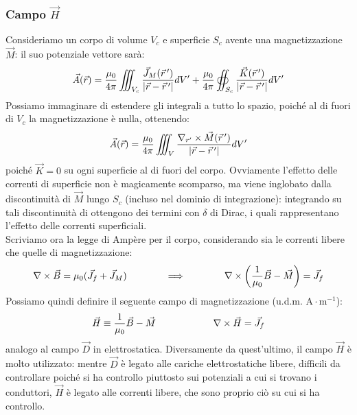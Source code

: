 \documentclass[]{article}
\begin{document}
\subsubsection{Campo $ \vec{H} $}

Consideriamo un corpo di volume $ V_c $ e superficie $ S_c $ avente una magnetizzazione $ \vec{M} $: il suo potenziale vettore sarà:
\begin{equation}
	\vec{A}(\vec{r}) = \frac{\mu_0}{4\pi} \iiint_{V_c} \frac{\vec{J}_M(\vec{r}\,')}{\left\lvert\vec{r}-\vec{r}\,'\right\rvert} dV' + \frac{\mu_0}{4\pi} \oiint_{S_c} \frac{\vec{K}(\vec{r}\,')}{\left\lvert\vec{r}-\vec{r}\,'\right\rvert} dV'
	\label{eq:20}
\end{equation}
Possiamo immaginare di estendere gli integrali a tutto lo spazio, poiché al di fuori di $ V_c $ la magnetizzazione è nulla, ottenendo:
\begin{equation}
	\vec{A}(\vec{r}) = \frac{\mu_0}{4\pi} \iiint_V \frac{\nabla_{r'}\times\vec{M}(\vec{r}\,')}{\left\lvert\vec{r}-\vec{r}\,'\right\rvert}dV'
	\label{eq:21}
\end{equation}
poiché $ \vec{K} = 0 $ su ogni superficie al di fuori del corpo. Ovviamente l'effetto delle correnti di superficie non è magicamente scomparso, ma viene inglobato dalla discontinuità di $ \vec{M} $ lungo $ S_c $ (incluso nel dominio di integrazione): integrando su tali discontinuità di ottengono dei termini con $ \delta $ di Dirac, i quali rappresentano l'effetto delle correnti superficiali. \\ 
%
Scriviamo ora la legge di Ampère per il corpo, considerando sia le correnti libere che quelle di magnetizzazione:
\begin{equation}
	\nabla\times\vec{B} = \mu_0 (\vec{J}_f + \vec{J}_M) \qquad\qquad\Longrightarrow\qquad\qquad \nabla\times\left(\frac{1}{\mu_0}\vec{B} - \vec{M}\right) = \vec{J}_f
	\label{eq:22}
\end{equation}
Possiamo quindi definire il seguente campo di magnetizzazione (u.d.m. $ \text{A}\cdot\text{m}^{-1} $):
\begin{equation}
	\vec{H} \equiv \frac{1}{\mu_0} \vec{B} - \vec{M} \qquad\qquad\qquad \nabla\times\vec{H} = \vec{J}_f
	\label{eq:23}
\end{equation}
analogo al campo $ \vec{D} $ in elettrostatica. Diversamente da quest'ultimo, il campo $ \vec{H} $ è molto utilizzato: mentre $ \vec{D} $ è legato alle cariche elettrostatiche libere, difficili da controllare poiché si ha controllo piuttosto sui potenziali a cui si trovano i conduttori, $ \vec{H} $ è legato alle correnti libere, che sono proprio ciò su cui si ha controllo. \\ 
\end{document}
